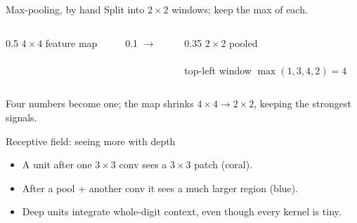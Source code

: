 \documentclass[10pt,aspectratio=169]{beamer}
\begin{document}
\begin{frame}{Max-pooling, by hand}
  Split into $2\times2$ windows; keep the max of each.
  \begin{columns}[T]
    \begin{column}{0.5\textwidth}
      \centering \small $4\times4$ feature map\\[3pt]
    \end{column}
    \begin{column}{0.1\textwidth}
      \centering\vspace{26pt}$\rightarrow$
    \end{column}
    \begin{column}{0.35\textwidth}
      \centering \small $2\times2$ pooled\\[3pt]
      \vspace{4pt}\\
      \scriptsize top-left window $\max(1,3,4,2)=4$
    \end{column}
  \end{columns}
  \vspace{2pt}
  Four numbers become one; the map shrinks $4\times4\rightarrow2\times2$, keeping the strongest signals.
\end{frame}

\begin{frame}{Receptive field: seeing more with depth}
  \begin{center}
  \end{center}
  \begin{itemize}
    \item A unit after one $3\times3$ conv sees a $3\times3$ patch (coral).
    \item After a pool + another conv it sees a much larger region (blue).
    \item Deep units integrate whole-digit context, even though every kernel is tiny.
  \end{itemize}
\end{frame}
\end{document}
